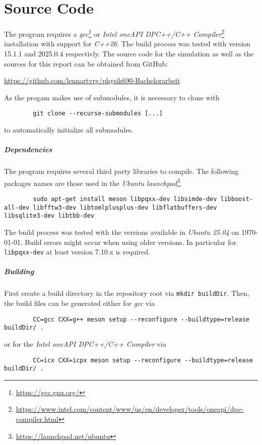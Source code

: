 \chapter{Source Code}
	The program requires a \emph{gcc}\footnote{\url{https://gcc.gnu.org/}} or \emph{Intel\textsuperscript{\tiny\textregistered} oneAPI DPC++/C++ Compiler}\footnote{\url{https://www.intel.com/content/www/us/en/developer/tools/oneapi/dpc-compiler.html}} installation with support for \emph{C++26}. The build process was tested with version 15.1.1 and 2025.0.4 respectivly. The source code for the simulation as well as the sources for this report can be obtained from GitHub:
	\begin{center}
		\url{https://github.com/lennartvrg/physik690-Bachelorarbeit}
	\end{center}
	As the progam makes use of submodules, it is necessary to clone with 
	\begin{verbatim}
		git clone --recurse-submodules [...]
	\end{verbatim}
	to automatically initialize all submodules.
	
	\paragraph{Dependencies}
	The program requires several third party libraries to compile. The following packages names are those used in the \emph{Ubuntu launchpad}\footnote{\url{https://launchpad.net/ubuntu}}.
	\begin{verbatim}
		sudo apt-get install meson libpqxx-dev libsimde-dev libboost-all-dev libfftw3-dev libtomlplusplus-dev libflatbuffers-dev libsqlite3-dev libtbb-dev
	\end{verbatim}
	The build process was tested with the versions available in \emph{Ubuntu 25.04} on \today. Build errors might occur when using older versions. In particular for \texttt{libpqxx-dev} at least version 7.10.x is required.
	
	\paragraph{Building}
	First create a build directory in the repository root via \texttt{mkdir buildDir}. Then, the build files can be generated either for \emph{gcc} via
	\begin{verbatim}
		CC=gcc CXX=g++ meson setup --reconfigure --buildtype=release buildDir/ .
	\end{verbatim}
	or for the \emph{Intel\textsuperscript{\tiny\textregistered} oneAPI DPC++/C++ Compiler} via
	\begin{verbatim}
		CC=icx CXX=icpx meson setup --reconfigure --buildtype=release buildDir/ .
	\end{verbatim}